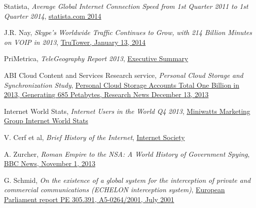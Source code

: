 \documentclass[twocolumn,english]{article}
\begin{document}
\begin{thebibliography}{9}

 Statista, \emph{Average Global Internet Connection Speed from 1st Quarter 2011 to 1st Quarter 2014}, \href{http://www.statista.com/statistics/204954/average-internet-connection-speed-worldwide/}{statista.com 2014}

 J.R. Nay, \emph{Skype's Worldwide Traffic Continues to Grow, with 214 Billion Minutes on VOIP in 2013}, \href{http://www.trutower.com/2014/01/13/skype-voip-app-calling-statistics-telegeography/}{TruTower, January 13, 2014}

 PriMetrica, \emph{TeleGeography Report 2013}, \href{http://www.telegeography.com/page_attachments/products/website/research-services/telegeography-report-database/0004/6341/TG_executive_summary.pdf}{Executive Summary}


 ABI Cloud Content and Services Research service, \emph{Personal Cloud Storage and Synchronization Study}, \href{https://www.abiresearch.com/press/personal-cloud-storage-accounts-total-one-billion-}{Personal Cloud Storage Accounts Total One Billion in 2013, Generating 685 Petabytes, Research News December 13, 2013}

 Internet World Stats, \emph{Internet Users in the World Q4 2013}, \href{http://www.internetworldstats.com/stats.htm}{Miniwatts Marketing Group Internet World Stats}

 V. Cerf et al, \emph{Brief History of the Internet}, \href{http://www.internetsociety.org/internet/what-internet/history-internet/brief-history-internet}{Internet Society}

 A. Zurcher, \emph{Roman Empire to the NSA: A World History of Government Spying}, \href{http://www.bbc.co.uk/news/magazine-24749166}{BBC News, November 1, 2013}

 G. Schmid, \emph{On the existence of a global system for the interception of private and commercial communications (ECHELON interception system)}, \href{http://www.europarl.europa.eu/sides/getDoc.do?pubRef=-//EP//TEXT+REPORT+A5-2001-0264+0+DOC+XML+V0//EN}{European Parliament report PE 305.391, A5-0264/2001, July 2001}


\end{thebibliography}
\end{document}
